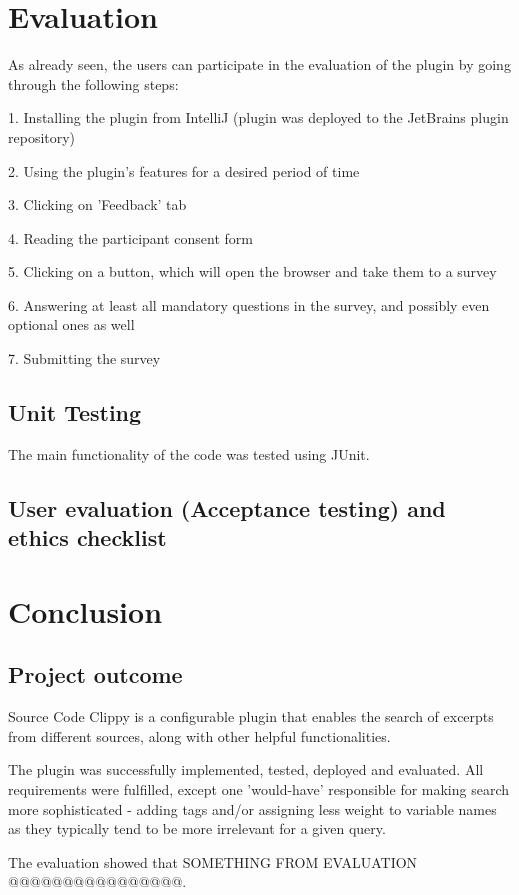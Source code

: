 \documentclass{l4proj}
\begin{document}
\chapter{Evaluation}
As already seen, the users can participate in the evaluation of the plugin by going through the following steps:

1. Installing the plugin from IntelliJ (plugin was deployed to the JetBrains plugin repository)

2. Using the plugin's features for a desired period of time

3. Clicking on 'Feedback' tab

4. Reading the participant consent form

5. Clicking on a button, which will open the browser and take them to a survey

6. Answering at least all mandatory questions in the survey, and possibly even optional ones as well

7. Submitting the survey

\section{Unit Testing}
The main functionality of the code was tested using JUnit.

\section{User evaluation (Acceptance testing) and ethics checklist}

\chapter{Conclusion}

\section{Project outcome}

Source Code Clippy is a configurable plugin that enables the search of excerpts from different sources, along with other helpful functionalities.

The plugin was successfully implemented, tested, deployed and evaluated. All requirements were fulfilled, except one 'would-have' responsible for making search more sophisticated - adding tags and/or assigning less weight to variable names as they typically tend to be more irrelevant for a given query.

The evaluation showed that SOMETHING FROM EVALUATION @@@@@@@@@@@@@@@@.
\end{document}
